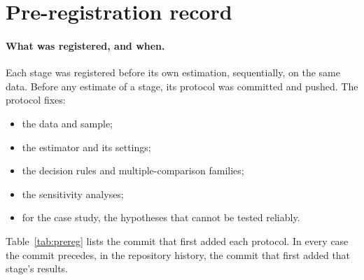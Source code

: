 \section{Pre-registration record}\label{app:prereg}

\paragraph{What was registered, and when.} Each stage was registered before its own
estimation, sequentially, on the same data. Before any estimate of a stage, its protocol
was committed and pushed. The protocol fixes:
\begin{itemize}
  \item the data and sample;
  \item the estimator and its settings;
  \item the decision rules and multiple-comparison families;
  \item the sensitivity analyses;
  \item for the case study, the hypotheses that cannot be tested reliably.
\end{itemize}
Table~\ref{tab:prereg} lists the commit that first added each protocol. In every case the
commit precedes, in the repository history, the commit that first added that stage's
results.

